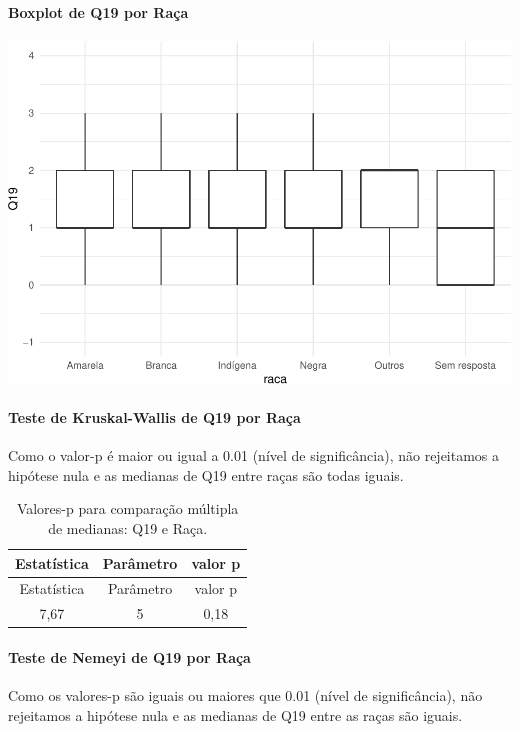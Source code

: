 \documentclass[]{article}
\let\oldparagraph\paragraph
\renewcommand{\paragraph}[1]{\oldparagraph{#1}\mbox{}}
\begin{document}
\hypertarget{boxplot-de-q19-por-rauxe7a}{%
\paragraph{Boxplot de Q19 por Raça}\label{boxplot-de-q19-por-rauxe7a}}

\begin{center}\includegraphics[width=0.75\linewidth]{relatorio_covid19_files/figure-latex/unnamed-chunk-342-1} \end{center}

\hypertarget{teste-de-kruskal-wallis-de-q19-por-rauxe7a}{%
\paragraph{Teste de Kruskal-Wallis de Q19 por Raça}\label{teste-de-kruskal-wallis-de-q19-por-rauxe7a}}

Como o valor-p é maior ou igual a 0.01 (nível de significância), não rejeitamos a hipótese nula e as medianas de Q19 entre raças são todas iguais.

\begin{longtable}[]{@{}ccc@{}}
\caption{\label{tab:unnamed-chunk-344}Valores-p para comparação múltipla de medianas: Q19 e Raça.}\tabularnewline
\toprule
Estatística & Parâmetro & valor p\tabularnewline
\midrule
\endfirsthead
\toprule
Estatística & Parâmetro & valor p\tabularnewline
\midrule
\endhead
7,67 & 5 & 0,18\tabularnewline
\bottomrule
\end{longtable}

\hypertarget{teste-de-nemeyi-de-q19-por-rauxe7a}{%
\paragraph{Teste de Nemeyi de Q19 por Raça}\label{teste-de-nemeyi-de-q19-por-rauxe7a}}

Como os valores-p são iguais ou maiores que 0.01 (nível de significância), não rejeitamos a hipótese nula e as medianas de Q19 entre as raças são iguais.
\end{document}
